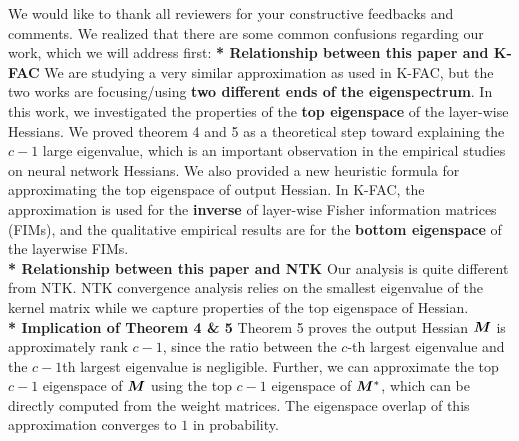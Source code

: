 \documentclass[12pt]{colt2022} %
\begin{document}
\title{}
We would like to thank all reviewers for your constructive feedbacks and comments. We realized that %
there are some common confusions regarding our work, which we will address first: %
\vskip 1mm
\noindent\textbf{* Relationship between this paper and K-FAC\quad}
We are studying a very similar approximation as used in K-FAC, but the two works are focusing/using \textbf{two different ends of the eigenspectrum}.
In this work, we investigated the properties of the \textbf{top eigenspace} of the layer-wise Hessians. We proved theorem 4 and 5 as a theoretical step toward explaining the $c-1$ large eigenvalue, which is an important observation in the empirical studies on neural network Hessians.
We also provided a new heuristic formula for approximating the top eigenspace of output Hessian.
In K-FAC, the approximation is used for the \textbf{inverse} of layer-wise Fisher information matrices (FIMs), and the qualitative empirical results are for the \textbf{bottom eigenspace} of the layerwise FIMs.
\\\noindent\textbf{* Relationship between this paper and NTK\quad}
Our analysis is quite different from NTK. NTK convergence analysis relies on the smallest eigenvalue of the kernel matrix while we capture properties of the top eigenspace of Hessian.
\\\noindent\textbf{* Implication of Theorem 4 \& 5\quad}
Theorem 5 proves the output Hessian ${\bm{M}}$ is approximately rank $c-1$, since the ratio between the $c$-th largest eigenvalue and the $c-1$th largest eigenvalue is negligible. Further, we can approximate the top $c-1$ eigenspace of ${\bm{M}}$ using the top $c-1$ eigenspace of ${\bm{M}}^*$, which can be directly computed from the weight matrices. The eigenspace overlap of this approximation converges to $1$ in probability.
\end{document}
